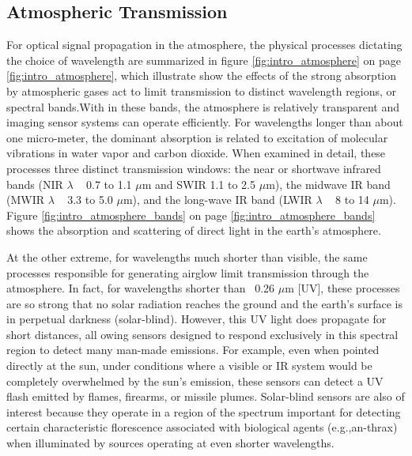 \subsection{Atmospheric Transmission}
\label{introAtmospheric}
For optical signal propagation in the atmosphere, the physical processes dictating the choice of wavelength are summarized in figure \ref{fig:intro_atmosphere} on page \ref{fig:intro_atmosphere}, which illustrate show the effects of the strong absorption by atmospheric gases act to limit transmission to distinct wavelength regions, or spectral bands.With in these bands, the atmosphere is relatively transparent and imaging sensor systems can operate efficiently. For wavelengths longer than about one micro-meter, the dominant absorption is related to excitation of molecular vibrations in water vapor and carbon dioxide. When examined in detail, these processes three distinct transmission windows: the near or shortwave infrared bands (\acs{NIR} $\lambda$ ~ 0.7 to 1.1 $\mu$m and \acs{SWIR} 1.1 to 2.5 $\mu$m), the midwave IR band (\acs{MWIR} $\lambda$ ~ 3.3 to 5.0 $\mu$m), and the long-wave IR band (\acs{LWIR} $\lambda$ ~ 8 to 14 $\mu$m). Figure \ref{fig:intro_atmosphere_bands} on page \ref{fig:intro_atmosphere_bands} shows the absorption and scattering of direct light in the earth's atmosphere.

At the other extreme, for wavelengths much shorter than visible, the same processes responsible for generating airglow limit transmission through the atmosphere. In fact, for wavelengths shorter than ~0.26 $\mu$m [\ac{UV}], these processes are so strong that no solar radiation reaches the ground and the earth's surface is in perpetual darkness (solar-blind). However, this \acs{UV} light does propagate for short distances, all owing sensors designed to respond exclusively in this spectral region to detect many man-made emissions. For example, even when pointed directly at the sun, under conditions where a visible or \ac{IR} system would be completely overwhelmed by the sun's emission, these sensors can detect a UV flash emitted by flames, firearms, or missile plumes. Solar-blind sensors are also of interest because they operate in a region of the spectrum important for detecting certain characteristic florescence associated with biological agents (e.g.,an-thrax) when illuminated by sources operating at even shorter wavelengths. 


